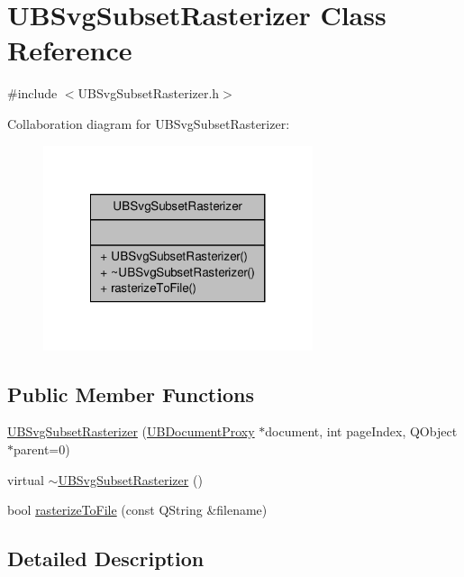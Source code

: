 \hypertarget{class_u_b_svg_subset_rasterizer}{\section{U\-B\-Svg\-Subset\-Rasterizer Class Reference}
\label{d9/dc7/class_u_b_svg_subset_rasterizer}
}


{\ttfamily \#include $<$U\-B\-Svg\-Subset\-Rasterizer.\-h$>$}



Collaboration diagram for U\-B\-Svg\-Subset\-Rasterizer\-:
\nopagebreak
\begin{figure}[H]
\begin{center}
\leavevmode
\includegraphics[width=224pt]{da/da6/class_u_b_svg_subset_rasterizer__coll__graph}
\end{center}
\end{figure}
\subsection*{Public Member Functions}
\begin{DoxyCompactItemize}
\item 
\hyperlink{class_u_b_svg_subset_rasterizer_a9b81cff0f16cdfe56bc22b1a946bb2b0}{U\-B\-Svg\-Subset\-Rasterizer} (\hyperlink{class_u_b_document_proxy}{U\-B\-Document\-Proxy} $\ast$document, int page\-Index, Q\-Object $\ast$parent=0)
\item 
virtual \hyperlink{class_u_b_svg_subset_rasterizer_a0f05ca65883f86048d89b853c033819b}{$\sim$\-U\-B\-Svg\-Subset\-Rasterizer} ()
\item 
bool \hyperlink{class_u_b_svg_subset_rasterizer_a747d13e01c5a4410020daa9ae6f53bf3}{rasterize\-To\-File} (const Q\-String \&filename)
\end{DoxyCompactItemize}


\subsection{Detailed Description}


